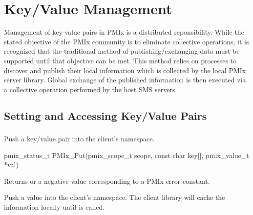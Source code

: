 \chapter{Key/Value Management}
\label{chap:api_kv_mgmt}

Management of key-value pairs in \ac{PMIx} is a distributed reponsibility. While the stated objective of the \ac{PMIx} community is to eliminate collective operations, it is recognized that the traditional method of publishing/exchanging data must be supported until that objective can be met. This method relies on processes to discover and publish their local information which is collected by the local PMIx server library.
Global exchange of the published information is then executed via a collective operation performed by the host \ac{SMS} servers.

\section{Setting and Accessing Key/Value Pairs}
\label{chap:api_kv_mgmt:access}


\subsection{}

\summary

Push a key/value pair into the client's namespace.

\format

\cspecificstart
\begin{codepar}
pmix_status_t
PMIx_Put(pmix_scope_t scope,
         const char key[], pmix_value_t *val)
\end{codepar}
\cspecificend

\begin{arglist}
\end{arglist}

Returns  or a negative value corresponding to a PMIx error constant.

\descr

Push a value into the client's namespace.
The client library will cache the information locally until  is called.

